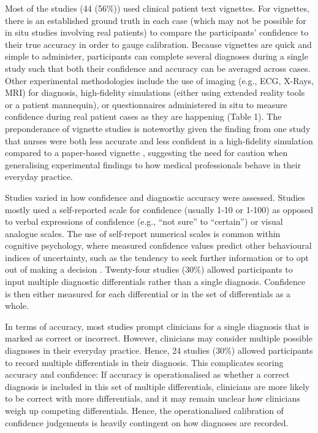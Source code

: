 \documentclass[a4paper, nobind]{templates/ociamthesis}
\begin{document}
\hfill\break
Most of the studies (44 (56\%)) used clinical patient text vignettes. For vignettes, there is an established ground truth in each case (which may not be possible for in situ studies involving real patients) to compare the participants' confidence to their true accuracy in order to gauge calibration. Because vignettes are quick and simple to administer, participants can complete several diagnoses during a single study such that both their confidence and accuracy can be averaged across cases. Other experimental methodologies include the use of imaging (e.g., ECG, X-Rays, MRI) for diagnosis, high-fidelity simulations (either using extended reality tools or a patient mannequin), or questionnaires administered in situ to measure confidence during real patient cases as they are happening (Table 1). The preponderance of vignette studies is noteworthy given the finding from one study that nurses were both less accurate and less confident in a high-fidelity simulation compared to a paper-based vignette \autocite{yang_effect_2012}, suggesting the need for caution when generalising experimental findings to how medical professionals behave in their everyday practice.

\hfill\break
Studies varied in how confidence and diagnostic accuracy were assessed. Studies mostly used a self-reported scale for confidence (usually 1-10 or 1-100) as opposed to verbal expressions of confidence (e.g., ``not sure'' to ``certain'') or visual analogue scales. The use of self-report numerical scales is common within cognitive psychology, where measured confidence values predict other behavioural indices of uncertainty, such as the tendency to seek further information or to opt out of making a decision \autocite{gherman_neural_2015}. Twenty-four studies (30\%) allowed participants to input multiple diagnostic differentials rather than a single diagnosis. Confidence is then either measured for each differential or in the set of differentials as a whole.

\hfill\break
In terms of accuracy, most studies prompt clinicians for a single diagnosis that is marked as correct or incorrect. However, clinicians may consider multiple possible diagnoses in their everyday practice. Hence, 24 studies (30\%) allowed participants to record multiple differentials in their diagnosis. This complicates scoring accuracy and confidence: If accuracy is operationalised as whether a correct diagnosis is included in this set of multiple differentials, clinicians are more likely to be correct with more differentials, and it may remain unclear how clinicians weigh up competing differentials. Hence, the operationalised calibration of confidence judgements is heavily contingent on how diagnoses are recorded.
\end{document}
